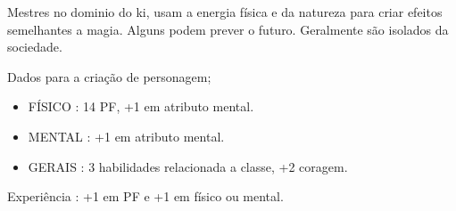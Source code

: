 Mestres no dominio do ki, usam a energia física e da natureza para criar efeitos semelhantes a magia. Alguns podem prever o futuro. Geralmente são isolados da sociedade.
 

Dados para a criação de personagem;

\begin{itemize}


	\item FÍSICO : 14 PF, +1 em atributo mental.

	\item MENTAL : +1 em atributo mental.

	\item GERAIS : 3 habilidades relacionada a classe, +2 coragem.

\end{itemize}

Experiência : +1 em PF e +1 em físico ou mental.

